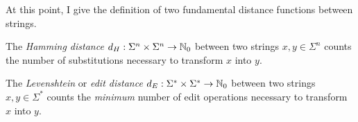 %

At this point, I give the definition of two fundamental distance functions between strings.

\begin{definition}
\label{def:hamming}
\citep{Hamming1950} The \emph{Hamming distance} $d_H : \Sigma^{n} \times \Sigma^{n} \rightarrow \mathbb {N}_0$ between two strings $x,y \in \Sigma^{n}$ counts the number of substitutions necessary to transform $x$ into $y$.
\end{definition}

\begin{definition}
\label{def:edit}
\citep{Levenshtein1966} The \emph{Levenshtein} or \emph{edit distance} $d_E : \Sigma^{*} \times \Sigma^{*} \rightarrow \mathbb {N}_0$ between two strings $x,y \in \Sigma^{*}$ counts the \emph{minimum} number of edit operations necessary to transform $x$ into $y$.
\end{definition}

